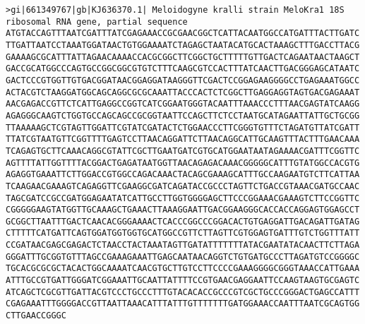 \documentclass[11pt]{article}
\begin{document}
\begin{Verbatim}[commandchars=\\\{\}]
>gi|661349767|gb|KJ636370.1| Meloidogyne kralli strain MeloKra1 18S ribosomal RNA gene, partial sequence
ATGTACCAGTTTAATCGATTTATCGAGAAACCGCGAACGGCTCATTACAATGGCCATGATTTACTTGATC
TTGATTAATCCTAAATGGATAACTGTGGAAAATCTAGAGCTAATACATGCACTAAAGCTTTGACCTTACG
GAAAAGCGCATTTATTAGAACAAAACCACGCGGCTTCGGCTGCTTTTTGTTGACTCAGAATAACTAAGCT
GACCGCATGGCCCAGTGCCGGCGGCGTGTCTTTCAAGCGTCCACTTTATCAACTTGACGGGAGCATAATC
GACTCCCGTGGTTGTGACGGATAACGGAGGATAAGGGTTCGACTCCGGAGAAGGGGCCTGAGAAATGGCC
ACTACGTCTAAGGATGGCAGCAGGCGCGCAAATTACCCACTCTCGGCTTGAGGAGGTAGTGACGAGAAAT
AACGAGACCGTTCTCATTGAGGCCGGTCATCGGAATGGGTACAATTTAAACCCTTTAACGAGTATCAAGG
AGAGGGCAAGTCTGGTGCCAGCAGCCGCGGTAATTCCAGCTTCTCCTAATGCATAGAATTATTGCTGCGG
TTAAAAAGCTCGTAGTTGGATTCGTATCGATACTCTGGAACCCTTCGGGTGTTTCTAGATGTTATCGATT
TTATCGTAATGTTCGGTTTTGAGTCCTTAACAGGATTCTTAACAGGCATTGCAAGTTTACTTTGAACAAA
TCAGAGTGCTTCAAACAGGCGTATTCGCTTGAATGATCGTGCATGGAATAATAGAAAACGATTTCGGTTC
AGTTTTATTGGTTTTACGGACTGAGATAATGGTTAACAGAGACAAACGGGGGCATTTGTATGGCCACGTG
AGAGGTGAAATTCTTGGACCGTGGCCAGACAAACTACAGCGAAAGCATTTGCCAAGAATGTCTTCATTAA
TCAAGAACGAAAGTCAGAGGTTCGAAGGCGATCAGATACCGCCCTAGTTCTGACCGTAAACGATGCCAAC
TAGCGATCCGCCGATGGAGAATATCATTGCCTTGGTGGGGAGCTTCCCGGAAACGAAAGTCTTCCGGTTC
CGGGGGAAGTATGGTTGCAAAGCTGAAACTTAAAGGAATTGACGGAAGGGCACCACCAGGAGTGGAGCCT
GCGGCTTAATTTGACTCAACACGGGAAAACTCACCCGGCCCGGACACTGTGAGGATTGACAGATTGATAG
CTTTTTCATGATTCAGTGGATGGTGGTGCATGGCCGTTCTTAGTTCGTGGAGTGATTTGTCTGGTTTATT
CCGATAACGAGCGAGACTCTAACCTACTAAATAGTTGATATTTTTTTATACGAATATACAACTTCTTAGA
GGGATTTGCGGTGTTTAGCCGAAAGAAATTGAGCAATAACAGGTCTGTGATGCCCTTAGATGTCCGGGGC
TGCACGCGCGCTACACTGGCAAAATCAACGTGCTTGTCCTTCCCCGAAAGGGGCGGGTAAACCATTGAAA
ATTTGCCGTGATTGGGATCGGAAATTGCAATTATTTTCCGTGAACGAGGAATTCCAAGTAAGTGCGAGTC
ATCAGCTCGCGTTGATTACGTCCCTGCCCTTTGTACACACCGCCCGTCGCTGCCCGGGACTGAGCCATTT
CGAGAAATTTGGGGACCGTTAATTAAACATTTATTTGTTTTTTTGATGGAAACCAATTTAATCGCAGTGG
CTTGAACCGGGC


\end{Verbatim}
\end{document}
